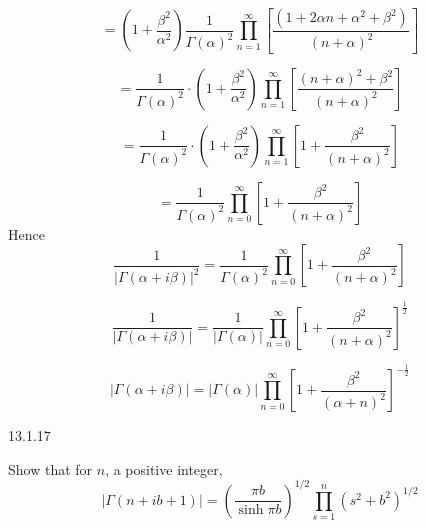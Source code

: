 \documentclass{styles/kaobook}
\begin{document}
$$
=\left(1+\frac{\beta^{2}}{\alpha^{2}}\right) \frac{1}{\Gamma(\alpha)^{2}} \prod_{n=1}^{\infty}\left[\frac{\left(1+2 \alpha n+\alpha^{2}+\beta^{2}\right)}{(n+\alpha)^{2}}\right]
$$

$$
=\frac{1}{\Gamma(\alpha)^{2}} \cdot\left(1+\frac{\beta^{2}}{\alpha^{2}}\right) \prod_{n=1}^{\infty}\left[\frac{(n+\alpha)^{2}+\beta^{2}}{(n+\alpha)^{2}}\right]
$$

$$
=\frac{1}{\Gamma(\alpha)^{2}} \cdot\left(1+\frac{\beta^{2}}{\alpha^{2}}\right) \prod_{n=1}^{\infty}\left[1+\frac{\beta^{2}}{(n+\alpha)^{2}}\right]
$$

$$
=\frac{1}{\Gamma(\alpha)^{2}} \prod_{n=0}^{\infty}\left[1+\frac{\beta^{2}}{(n+\alpha)^{2}}\right]
$$
Hence
$$
\frac{1}{|\Gamma(\alpha+i \beta)|^{2}}=\frac{1}{\Gamma(\alpha)^{2}} \prod_{n=0}^{\infty}\left[1+\frac{\beta^{2}}{(n+\alpha)^{2}}\right]
$$

$$
\frac{1}{|\Gamma(\alpha+i \beta)|}=\frac{1}{|\Gamma(\alpha)|} \prod_{n=0}^{\infty}\left[1+\frac{\beta^{2}}{(n+\alpha)^{2}}\right]^{\frac{1}{2}}
$$

$$
|\Gamma(\alpha+i \beta)|=|\Gamma(\alpha)| \prod_{n=0}^{\infty}\left[1+\frac{\beta^{2}}{(\alpha+n)^{2}}\right]^{-\frac{1}{2}}
$$




\begin{greenbox}{13.1.17}

Show that for $n$, a positive integer,
$$
|\Gamma(n+i b+1)|=\left(\frac{\pi b}{\sinh \pi b}\right)^{1 / 2} \prod_{s=1}^{n}\left(s^{2}+b^{2}\right)^{1 / 2}
$$
\end{greenbox}
\end{document}
